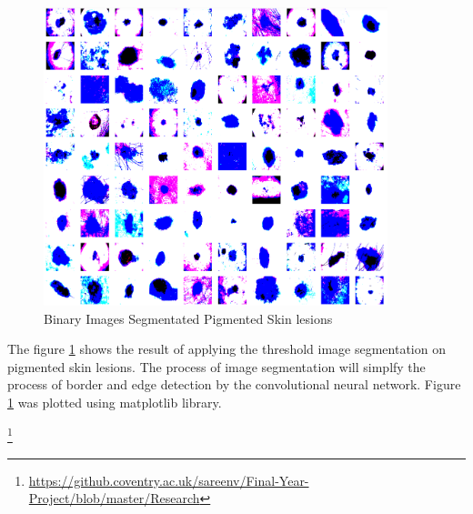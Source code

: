 \begin{figure}[!htp]
	\centering
	\includegraphics[width=10cm]{Images/aseg.png}
	\caption{Binary Images Segmentated Pigmented Skin lesions}
	\label{fig:after_seg}
\end{figure}

The figure \ref{fig:after_seg} shows the result of applying the threshold image segmentation on 
pigmented skin lesions. The process of image segmentation will simplfy the process of 
border and edge detection by the convolutional neural network. Figure \ref{fig:after_seg} was 
plotted using matplotlib library.

\footnote{\url{https://github.coventry.ac.uk/sareenv/Final-Year-Project/blob/master/Research}}

